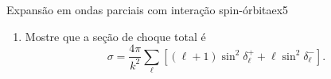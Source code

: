 \begin{exercício}{Expansão em ondas parciais com interação spin-órbita\cite{gottfried}}{ex5}
\begin{enumerate}[label=(\alph*)]
          \begin{equation*}
             g(k,\theta) = \frac1k \sum_{\ell = 0}^\infty \left(\frac{4\pi}{2\ell + 1}\right)^{\frac12} \left[(\ell + 1) a_\ell^+ + \ell a_\ell^-\right]Y_{\ell 0}(\theta)
          \end{equation*}
          e
          \begin{equation*}
             h(k,\theta) = \frac1k \sum_{\ell = 0}^\infty \left(\frac{4\pi}{2\ell + 1}\right)^{\frac12} \left[a_\ell^+ - a_\ell^-\right]i\sin\theta\diff*{Y_{\ell 0}(\theta)}{\cos\theta},
          \end{equation*}
          onde \(a_{\ell}^\pm = e^{i \delta_{\ell}^\pm} \sin\delta_{\ell}^{\pm}.\)
       \item Mostre que a seção de choque total é
          \begin{equation*}
             \sigma = \frac{4\pi}{k^2} \sum_{\ell} \left[(\ell + 1)\sin^2\delta^+_\ell + \ell \sin^2 \delta_\ell^-\right].
          \end{equation*}
   \end{enumerate}
\end{exercício}

